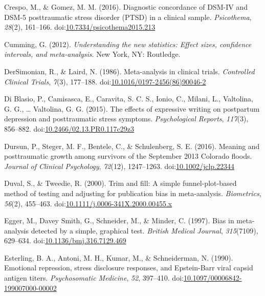 \documentclass[english,man, mask]{apa6}
\theoremstyle{definition}
\theoremstyle{definition}
\theoremstyle{definition}
\theoremstyle{remark}
\begin{document}
\hypertarget{ref-Crespo2016}{}
Crespo, M., \& Gomez, M. M. (2016). Diagnostic concordance of DSM-IV and
DSM-5 posttraumatic stress disorder (PTSD) in a clinical sample.
\emph{Psicothema}, \emph{28}(2), 161--166.
doi:\href{https://doi.org/10.7334/psicothema2015.213}{10.7334/psicothema2015.213}

\hypertarget{ref-Cumming2012}{}
Cumming, G. (2012). \emph{Understanding the new statistics: Effect
sizes, confidence intervals, and meta-analysis}. New York, NY:
Routledge.

\hypertarget{ref-DerSimonian1986}{}
DerSimonian, R., \& Laird, N. (1986). Meta-analysis in clinical trials.
\emph{Controlled Clinical Trials}, \emph{7}(3), 177--188.
doi:\href{https://doi.org/10.1016/0197-2456(86)90046-2}{10.1016/0197-2456(86)90046-2}

\hypertarget{ref-Blasio2015a}{}
Di Blasio, P., Camisasca, E., Caravita, S. C. S., Ionio, C., Milani, L.,
Valtolina, G. G., \ldots{} Valtolina, G. G. (2015). The effects of
expressive writing on postpartum depression and posttraumatic stress
symptoms. \emph{Psychological Reports}, \emph{117}(3), 856--882.
doi:\href{https://doi.org/10.2466/02.13.PR0.117c29z3}{10.2466/02.13.PR0.117c29z3}

\hypertarget{ref-Dursun2016}{}
Dursun, P., Steger, M. F., Bentele, C., \& Schulenberg, S. E. (2016).
Meaning and posttraumatic growth among survivors of the September 2013
Colorado floods. \emph{Journal of Clinical Psychology}, \emph{72}(12),
1247--1263.
doi:\href{https://doi.org/10.1002/jclp.22344}{10.1002/jclp.22344}

\hypertarget{ref-Duval2000}{}
Duval, S., \& Tweedie, R. (2000). Trim and fill: A simple
funnel-plot-based method of testing and adjusting for publication bias
in meta-analysis. \emph{Biometrics}, \emph{56}(2), 455--463.
doi:\href{https://doi.org/10.1111/j.0006-341X.2000.00455.x}{10.1111/j.0006-341X.2000.00455.x}

\hypertarget{ref-Egger1997}{}
Egger, M., Davey Smith, G., Schneider, M., \& Minder, C. (1997). Bias in
meta-analysis detected by a simple, graphical test. \emph{British
Medical Journal}, \emph{315}(7109), 629--634.
doi:\href{https://doi.org/10.1136/bmj.316.7129.469}{10.1136/bmj.316.7129.469}

\hypertarget{ref-Esterling1990}{}
Esterling, B. A., Antoni, M. H., Kumar, M., \& Schneiderman, N. (1990).
Emotional repression, stress disclosure responses, and Epstein-Barr
viral capsid antigen titers. \emph{Psychosomatic Medicine}, \emph{52},
397--410.
doi:\href{https://doi.org/10.1097/00006842-199007000-00002}{10.1097/00006842-199007000-00002}
\end{document}
